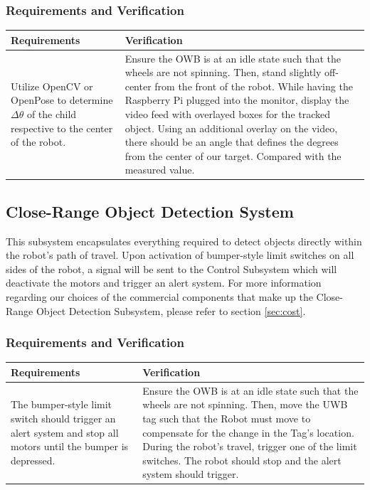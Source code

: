 \documentclass[journal,onecolumn, draftclsnofoot, 12pt]{IEEEtran}
\begin{document}
\newpage

\subsubsection{Requirements and Verification}
\begin{center}
\begin{tabular}{ | m{20em} || m{20em} | } 
  \hline
  Requirements & Verification  \\ 
  \hline
  \hline
  Utilize OpenCV or OpenPose to determine $\Delta \theta$ of the child respective to the center of the robot.
  & 
  Ensure the OWB is at an idle state such that the wheels are not spinning. Then, stand slightly off-center from the front of the robot. While having the Raspberry Pi plugged into the monitor, display the video feed with overlayed boxes for the tracked object. Using an additional overlay on the video, there should be an angle that defines the degrees from the center of our target. Compared with the measured value.
  \\ 
  \hline
\end{tabular}
\end{center}

\subsection{Close-Range Object Detection System}
This subsystem encapsulates everything required to detect objects directly within the robot's path of travel. Upon activation of bumper-style limit switches on all sides of the robot, a signal will be sent to the Control Subsystem which will deactivate the motors and trigger an alert system. For more information regarding our choices of the commercial components that make up the Close-Range Object Detection Subsystem, please refer to section \ref{sec:cost}.

\subsubsection{Requirements and Verification}
\begin{center}
\begin{tabular}{ | m{20em} || m{20em} | } 
  \hline
  Requirements & Verification  \\ 
  \hline
  \hline
  The bumper-style limit switch should trigger an alert system and stop all motors until the bumper is depressed.
  & 
  Ensure the OWB is at an idle state such that the wheels are not spinning. Then, move the UWB tag such that the Robot must move to compensate for the change in the Tag's location. During the robot's travel, trigger one of the limit switches. The robot should stop and the alert system should trigger.
  \\ 
  \hline
\end{tabular}
\end{center}
\end{document}
